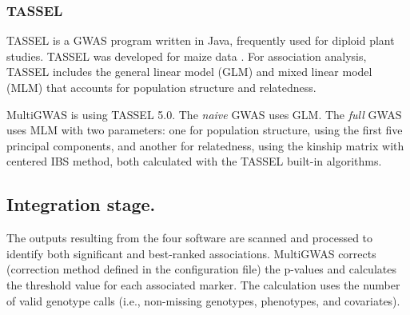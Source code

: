 \documentclass{article}
\begin{document}
\subsubsection{TASSEL}

TASSEL  \cite{Bradbury2007}  is a GWAS program written in Java, frequently used for diploid plant studies. TASSEL was developed for maize data \cite{Alvarez2017,Zhang2018}. For association analysis, TASSEL includes the general linear model (GLM) and mixed linear model (MLM) that accounts for population structure and relatedness.

MultiGWAS is using TASSEL 5.0. The \emph{naive} GWAS uses GLM. The \emph{full} GWAS uses MLM with two parameters: one for population structure, using the first five principal components, and another for relatedness, using the kinship matrix with centered IBS method, both calculated with the TASSEL built-in algorithms.


\subsection{Integration stage.} The outputs resulting from the four software are scanned and processed to identify both significant and best-ranked associations. MultiGWAS corrects (correction method defined in the configuration file) the p-values and calculates the threshold value for each associated marker. The calculation uses the number of valid genotype calls (i.e., non-missing genotypes, phenotypes, and covariates). 
\end{document}
